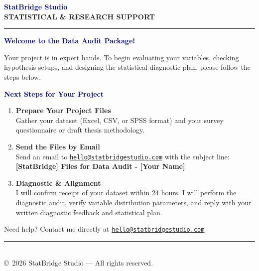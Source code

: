 \documentclass[11pt,a4paper]{article}
\begin{document}
\begin{center}
    {\Huge \bfseries \textcolor{navy}{StatBridge Studio}} \\[0.25em]
    {\small \bfseries \textcolor{amber}{STATISTICAL \& RESEARCH SUPPORT}} \\
    \rule{\linewidth}{1.5pt}
\end{center}

\vspace{2em}

{\LARGE \bfseries \textcolor{navy}{Welcome to the Data Audit Package!}}

Your project is in expert hands. To begin evaluating your variables, checking hypothesis setups, and designing the statistical diagnostic plan, please follow the steps below.

\vspace{1.5em}

\noindent\makebox[\linewidth]{\rule{\textwidth}{0.8pt}}
\vspace{-0.5em}
\begin{center}
\begin{minipage}{0.95\textwidth}
    {\large \bfseries \textcolor{navy}{Next Steps for Your Project}}
    \begin{enumerate}[label=\textbf{\color{royalblue}\arabic*.}, leftmargin=1.5em]
        \item \textbf{Prepare Your Project Files} \\
        Gather your dataset (Excel, CSV, or SPSS format) and your survey questionnaire or draft thesis methodology.
        
        \item \textbf{Send the Files by Email} \\
        Send an email to \href{mailto:hello@statbridgestudio.com}{\texttt{hello@statbridgestudio.com}} with the subject line: \\
        \textbf{[StatBridge] Files for Data Audit - [Your Name]}
        
        \item \textbf{Diagnostic \& Alignment} \\
        I will confirm receipt of your dataset within 24 hours. I will perform the diagnostic audit, verify variable distribution parameters, and reply with your written diagnostic feedback and statistical plan.
    \end{enumerate}
\end{minipage}
\end{center}
\noindent\makebox[\linewidth]{\rule{\textwidth}{0.8pt}}

\vspace{3em}

\begin{center}
    \textcolor{textlight}{Need help? Contact me directly at} \href{mailto:hello@statbridgestudio.com}{\texttt{hello@statbridgestudio.com}} \\[1.5em]
    \rule{0.5\linewidth}{0.5pt} \\
    \vspace{0.5em}
    \footnotesize \textcolor{textlight}{\copyright\ 2026 StatBridge Studio — All rights reserved.}
\end{center}
\end{document}
